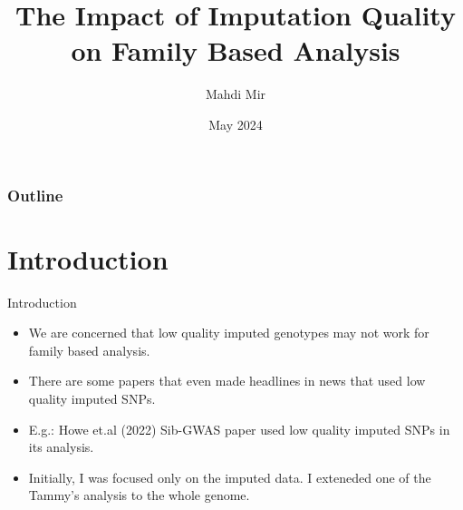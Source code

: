 \documentclass{beamer}
\title{The Impact of Imputation Quality \\ on Family Based Analysis}
\author[]{Mahdi Mir}
\date[]{May 2024}
\begin{document}
\maketitle


\begin{frame}[label=outl]
    \frametitle{Outline}
    \tableofcontents{}
\end{frame}


\section{Introduction}


\begin{frame}{Introduction}


\begin{itemize}
      \item We are concerned that low quality imputed genotypes may not work for family based analysis.
      \item There are some papers that even made headlines in news that used low quality imputed SNPs. %
      \item E.g.: Howe et.al (2022) Sib-GWAS paper used low quality imputed SNPs in its analysis. %
      \item Initially, I was focused only on the imputed data. I exteneded one of the Tammy's analysis to the whole genome.
\end{itemize}

    
\end{frame}
\end{document}
